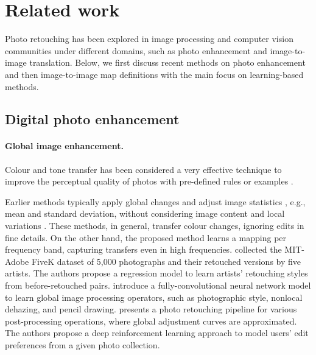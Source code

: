 \section{Related work}

Photo retouching has been explored in image processing and computer vision communities under different domains, such as photo enhancement and image-to-image translation. Below, we first discuss recent methods on photo enhancement and then image-to-image map definitions with the main focus on learning-based methods.

\subsection{Digital photo enhancement}
\paragraph{Global image enhancement.} Colour and tone transfer has been considered a very effective technique to improve the perceptual quality of photos with pre-defined rules or examples \cite{Faridul14ASurvey, mustafa2022distilling}. 

Earlier methods typically apply global changes and adjust image statistics \cite{Bychkovsky11Learning, Bae06Two, Pitie05NDimensional,Pitie07Automated,Reinhard01Color,Sunkavalli10Multi, he2020conditional, park2018distort}, e.g., mean and standard deviation, without considering image content and local variations \cite{CohenOr06Color}. These methods, in general, transfer colour changes, ignoring edits in fine details. On the other hand, the proposed method learns a mapping per frequency band, capturing transfers even in high frequencies. \citeauthor{Bychkovsky11Learning} \cite{Bychkovsky11Learning} collected the MIT-Adobe FiveK dataset of 5,000 photographs and their retouched versions by five artists. The authors propose a regression model to learn artists' retouching styles from before-retouched pairs. \citeauthor{chen2017fast} \cite{chen2017fast} introduce a fully-convolutional neural network model to learn global image processing operators, such as photographic style, nonlocal dehazing, and pencil drawing. \citeauthor{Hu18Exposure} \cite{Hu18Exposure} presents a photo retouching pipeline for various post-processing operations, where global adjustment curves are approximated. The authors propose a deep reinforcement learning approach to model users' edit preferences from a given photo collection. 
 
